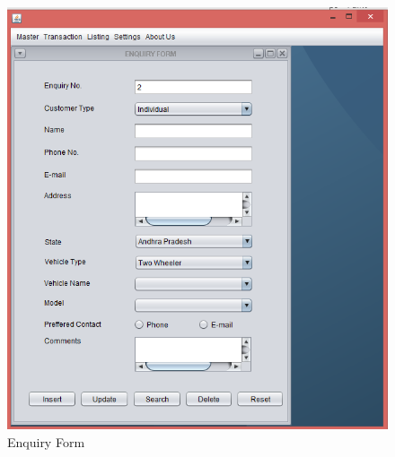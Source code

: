 \begin{figure}[ht]
\begin{center}
\includegraphics[scale=0.5]{images/image22.png}
\end{center}
\caption{Enquiry Form}
\label{Enquiry Form}
\end{figure}


